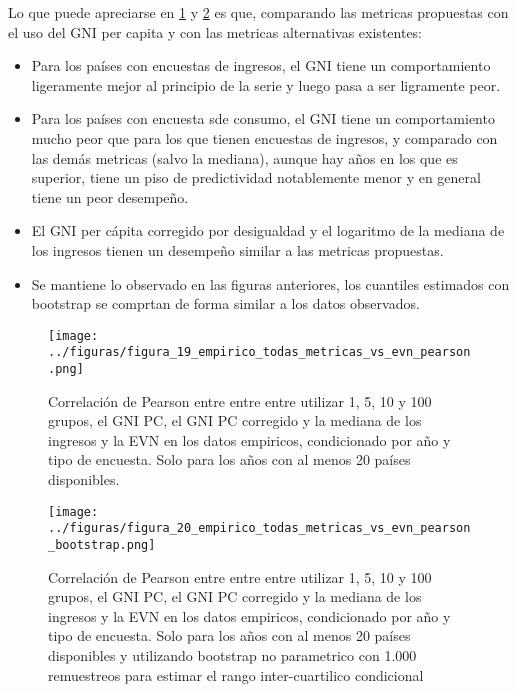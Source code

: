 Lo que puede apreciarse en \ref{fig:19} y \ref{fig:20} es que, comparando las metricas propuestas con el uso del GNI per capita y con las metricas alternativas existentes:


\begin{itemize}
    \item  Para los países con encuestas de ingresos, el GNI tiene un comportamiento ligeramente mejor al principio de la serie y luego pasa a ser ligramente peor.
    \item Para los países con encuesta sde consumo, el GNI tiene un comportamiento mucho peor que para los que tienen encuestas de ingresos, y comparado con las demás metricas (salvo la mediana), aunque hay años en los que es superior, tiene un piso de predictividad notablemente menor y en general tiene un peor desempeño.
    \item El GNI per cápita corregido por desigualdad y el logaritmo de la mediana de los ingresos tienen un desempeño similar a las metricas propuestas.
    \item Se mantiene lo observado en las figuras anteriores, los cuantiles estimados con bootstrap se comprtan de forma similar a los datos observados.
\end{itemize}


\begin{figure}[H] %
    \centering %
    \texttt{[image: ../figuras/figura\_19\_empirico\_todas\_metricas\_vs\_evn\_pearson.png]} %
    \caption{Correlación de Pearson entre entre entre utilizar 1, 5, 10 y 100 grupos, el GNI PC, el GNI PC corregido y la mediana de los ingresos y la EVN en los datos empiricos, condicionado por año y tipo de encuesta. Solo para los años con al menos 20 países disponibles.}
    \label{fig:19} %
\end{figure}

\begin{figure}[H] %
    \centering %
    \texttt{[image: ../figuras/figura\_20\_empirico\_todas\_metricas\_vs\_evn\_pearson\_bootstrap.png]} %
    \caption{Correlación de Pearson entre entre entre utilizar 1, 5, 10 y 100 grupos, el GNI PC, el GNI PC corregido y la mediana de los ingresos y la EVN en los datos empiricos, condicionado por año y tipo de encuesta. Solo para los años con al menos 20 países disponibles y utilizando bootstrap no parametrico con 1.000 remuestreos para estimar el rango inter-cuartilico condicional}
    \label{fig:20} %
\end{figure}


